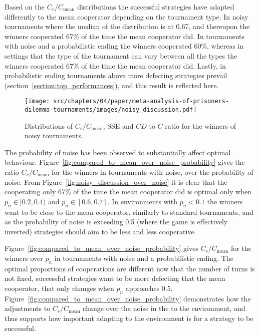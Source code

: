 Based on the \(C_r / C_{\text{mean}}\) distributions the successful strategies
have adapted differently to the mean cooperator depending on the tournament
type. In noisy tournaments where the median of the distribution is at 0.67, and
thereupon the winners cooperated 67\% of the time the mean cooperator did. In
tournaments with noise and a probabilistic ending the winners cooperated 60\%,
whereas in settings that the type of the tournament can vary between all the
types the winners cooperated 67\% of the time the mean cooperator did. Lastly,
in probabilistic ending tournaments above more defecting
strategies prevail (section~\ref{section:top_performances}), and this result is
reflected here.

\begin{figure}[!htbp]
    \centering
        \centering
        \texttt{[image: src/chapters/04/paper/meta-analysis-of-prisoners-dilemma-tournaments/images/noisy\_discussion.pdf]}
        \caption{Distributions of \(C_r / C_{\text{mean}}\), SSE and \(CD\) to \(C\) ratio
        for the winners of noisy tournaments.}
        \label{fig:discussion_noisy}
\end{figure}

The probability of noise has been observed to substantially affect optimal
behaviour.
Figure~\ref{fig:compared_to_mean_over_noise_probability} gives the ratio \(C_r /
C_{\text{mean}}\) for the winners in tournaments with noise, over the
probability of noise. From Figure~\ref{fig:noisy_discussion_over_noise} it is
clear that the cooperating only 67\% of the time the mean cooperator did is
optimal only when \(p_n \in [0.2, 0.4)\) and \(p_n \in [0.6, 0.7]\). In
environments with \(p_n < 0.1\) the winners want to be close to the mean
cooperator, similarly to standard tournaments, and as the probability of noise
is exceeding 0.5 (where the game is effectively inverted) strategies should
aim to be less and less cooperative.

Figure~\ref{fig:compared_to_mean_over_noise_probability} gives \(C_r /
C_{\text{mean}}\) for the winners over \(p_n\) in tournaments with noise and a
probabilistic ending. The optimal proportions of cooperations are different
now that the number of turns is not fixed, successful strategies
want to be more defecting that the mean cooperator, that only changes when
\(p_n\) approaches 0.5. Figure~\ref{fig:compared_to_mean_over_noise_probability}
demonstrates how the adjustments to \(C_r /C_{\text{mean}}\) change over the
noise in the to the environment, and thus supports how important adapting to
the environment is for a strategy to be successful.

